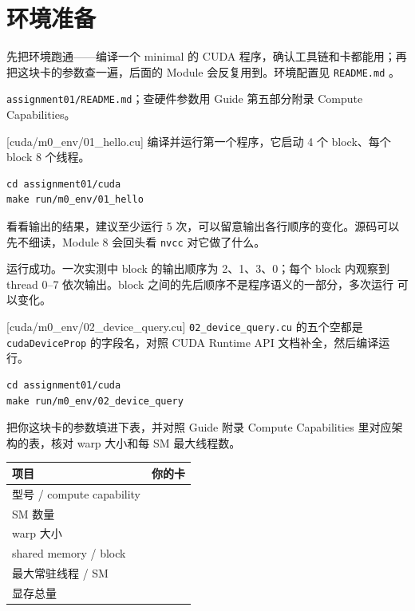 \documentclass[11pt,a4paper,fontset=fandol]{ctexart}
\begin{document}
\setcounter{section}{-1}

\section{环境准备}

先把环境跑通——编译一个 minimal 的 CUDA 程序，确认工具链和卡都能用；再把这块卡的参数查一遍，后面的 Module 会反复用到。环境配置见 \texttt{README.md} 。

\begin{reading}
\texttt{assignment01/README.md}；查硬件参数用 Guide 第五部分附录 Compute Capabilities。
\end{reading}

[cuda/m0\_env/01\_hello.cu]
编译并运行第一个程序，它启动 4 个 block、每个 block 8 个线程。

\begin{lstlisting}
cd assignment01/cuda
make run/m0_env/01_hello
\end{lstlisting}

看看输出的结果，建议至少运行 5 次，可以留意输出各行顺序的变化。源码可以先不细读，Module 8 会回头看 \texttt{nvcc} 对它做了什么。

\begin{answer}
运行成功。一次实测中 block 的输出顺序为 2、1、3、0；每个 block 内观察到
thread 0--7 依次输出。block 之间的先后顺序不是程序语义的一部分，多次运行
可以变化。
\end{answer}

[cuda/m0\_env/02\_device\_query.cu]
\texttt{02\_device\_query.cu} 的五个空都是 \texttt{cudaDeviceProp} 的字段名，对照 CUDA Runtime API 文档补全，然后编译运行。

\begin{lstlisting}
cd assignment01/cuda
make run/m0_env/02_device_query
\end{lstlisting}

把你这块卡的参数填进下表，并对照 Guide 附录 Compute Capabilities 里对应架构的表，核对 warp 大小和每 SM 最大线程数。

\begin{center}\small
\begin{tabular}{@{}ll@{}}
\toprule
项目 & 你的卡 \\
\midrule
型号 / compute capability & \\
SM 数量 & \\
warp 大小 & \\
shared memory / block & \\
最大常驻线程 / SM & \\
显存总量 & \\
\bottomrule
\end{tabular}
\end{center}
\end{document}
